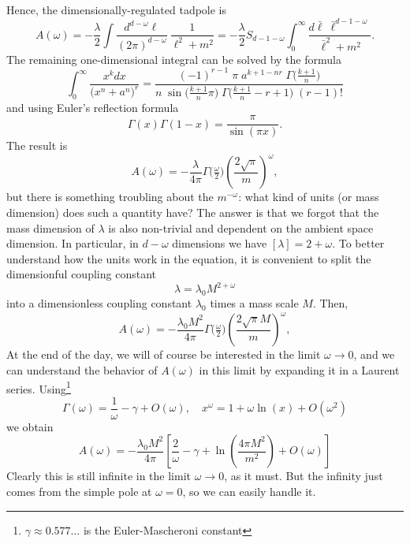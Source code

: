 Hence, the dimensionally-regulated tadpole is 
\begin{equation}
  A(\omega) = -\frac{\lambda}{2}
  \int
  \frac{d^{d-\omega}\ell}{(2\pi)^{d-\omega}} ~
  \frac{1}{\ell^2 + m^2}
  = -\frac{\lambda}{2}
  S_{d-1-\omega}
  \int_0^\infty \frac{d\bar\ell ~ \bar\ell^{d-1-\omega}}{\bar\ell^2 + m^2}.
\end{equation}
The remaining one-dimensional integral can be solved by the formula
\begin{equation}
  \int_0^\infty 
  \frac{x^k dx}{\big(x^n + a^n\big)^r} 
  =
  \frac{
    (-1)^{r-1}\; \pi \; a^{k+1-nr} \; \Gamma\big(\tfrac{k+1}{n}\big)
  }{
    n \; \sin\big(\tfrac{k+1}{n} \pi\big) 
    \; \Gamma\big(\tfrac{k+1}{n}-r+1\big) 
    \; (r-1)!
  }
\end{equation}
and using Euler's reflection formula
\begin{equation}
  \Gamma(x) \Gamma(1-x) = \frac{\pi}{\sin(\pi x)}.
\end{equation}
The result is 
\begin{equation}
  A(\omega) = -\frac{\lambda}{4\pi} 
  \Gamma\big(\tfrac{\omega}{2}\big)
  \left(\frac{2 \sqrt{\pi}}{m} \right)^\omega,
\end{equation}
but there is something troubling about the $m^{-\omega}$: what kind of
units (or mass dimension) does such a quantity have? The answer is
that we forgot that the mass dimension of $\lambda$ is also
non-trivial and dependent on the ambient space dimension. In
particular, in $d-\omega$ dimensions we have $[\lambda] =
2+\omega$. To better understand how the units work in the equation, it
is convenient to split the dimensionful coupling constant
\begin{equation}
  \lambda = \lambda_0 M^{2+\omega}
\end{equation}
into a dimensionless coupling constant $\lambda_0$ times a mass scale
$M$. Then,
\begin{equation}
  A(\omega) = -\frac{\lambda_0 M^2}{4\pi} 
  \Gamma\big(\tfrac{\omega}{2}\big)
  \left(\frac{2 \sqrt{\pi}M}{m} \right)^\omega,
\end{equation}
At the end of the day, we will of course be interested in the limit
$\omega\to 0$, and we can understand the behavior of $A(\omega)$ in
this limit by expanding it in a Laurent
series. Using\footnote{$\gamma\approx 0.577\dots$ is the
  Euler-Mascheroni constant}
\begin{equation}
  \Gamma(\omega) = \frac{1}{\omega} - \gamma + O(\omega)
  ,\quad
  x^\omega = 1 + \omega \ln(x) + O(\omega^2)
\end{equation}
we obtain
\begin{equation}
  A(\omega) = -\frac{\lambda_0 M^2}{4\pi}
  \left[
    \frac{2}{\omega}
    - \gamma
    + \ln\left(
      \frac{4\pi M^2}{m^2}
    \right)
    + O(\omega)
  \right]
\end{equation}
Clearly this is still infinite in the limit $\omega\to 0$, as it
must. But the infinity just comes from the simple pole at $\omega=0$,
so we can easily handle it.




